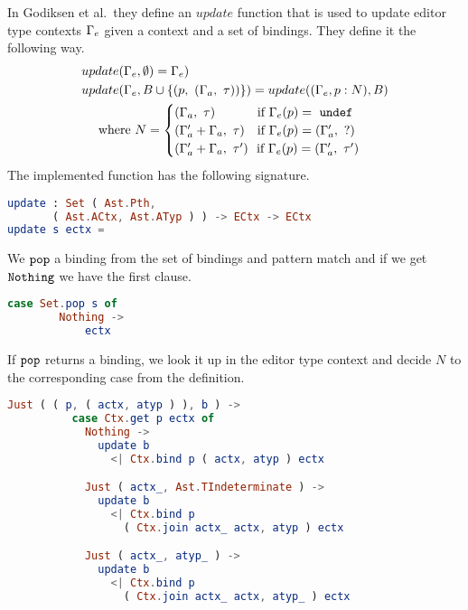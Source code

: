 In Godiksen et al.\pepm~they define an $update$ function that is used to update
editor type contexts $\Gamma_{e}$ given a context and a set of bindings. They
define it the following way.
\begin{align*}
&update(\Gamma_{e},\emptyset)=\Gamma_{e})\\
&update(\Gamma_{e},B\cup\{(p,~(\Gamma_{a},~\tau))\})=update((\Gamma_{e},p : N),B)\\
&~~~~\text{where } N =
    \begin{cases}
      (\Gamma_{a},~\tau) ~~~~~~~~~~\text{if}~\Gamma_{e}(p) =~\texttt{undef} \\
      (\Gamma_{a}' + \Gamma_{a},~\tau) ~~~\text{if}~\Gamma_{e}(p) = (\Gamma_{a}',~?) \\
      (\Gamma_{a}' + \Gamma_{a},~\tau') ~~\text{if}~\Gamma_{e}(p) = (\Gamma_{a}',~\tau') \\
    \end{cases}\\
\end{align*}
The implemented function has the following signature.
\begin{lstlisting}[language=elm,%
    gobble=0,%
    ]
update : Set ( Ast.Pth,
       ( Ast.ACtx, Ast.ATyp ) ) -> ECtx -> ECtx
update s ectx =
\end{lstlisting}
We $\texttt{pop}$ a binding from the set of bindings and pattern match and if we
get $\texttt{Nothing}$ we have the first clause.
\begin{lstlisting}[language=elm,%
    gobble=4,%
    ]
    case Set.pop s of
        Nothing ->
            ectx
\end{lstlisting}
If $\texttt{pop}$ returns a binding, we look it up in the editor type context and
decide $N$ to the corresponding case from the definition.
\begin{lstlisting}[language=elm,%
    gobble=8,%
    ]
        Just ( ( p, ( actx, atyp ) ), b ) ->
          case Ctx.get p ectx of
            Nothing ->
              update b
                <| Ctx.bind p ( actx, atyp ) ectx

            Just ( actx_, Ast.TIndeterminate ) ->
              update b
                <| Ctx.bind p
                  ( Ctx.join actx_ actx, atyp ) ectx

            Just ( actx_, atyp_ ) ->
              update b
                <| Ctx.bind p
                  ( Ctx.join actx_ actx, atyp_ ) ectx
\end{lstlisting}



